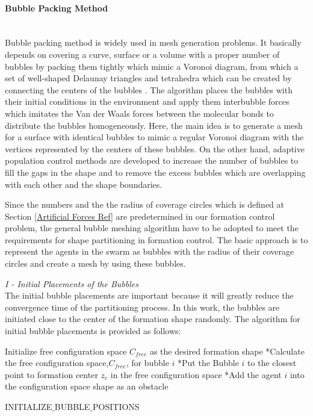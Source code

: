 \paragraph{Bubble Packing Method} \hspace{0pt} \\				
Bubble packing method is widely used in mesh generation problems. It basically depends on covering a curve, surface or a volume with a proper number of bubbles by packing them tightly which mimic a Voronoi diagram, from which a set of well-shaped Delaunay triangles and tetrahedra which can be created by connecting the centers of the bubbles \cite{27}.  The algorithm places the bubbles with their initial conditions in the environment and apply them interbubble forces which imitates the Van der Waals forces between the molecular bonds  to distribute the bubbles homogeneously. Here, the main idea is to generate a mesh for a surface with identical bubbles to mimic a regular Voronoi diagram with the vertices represented by the centers of these bubbles. On the other hand, adaptive population control  methods are developed to increase the number of bubbles to fill the gaps in the shape and to remove the excess bubbles which are overlapping with each other and the shape boundaries. 

Since the numbers and the the radius of coverage circles which is defined at Section \ref{Artificial Forces Ref} are predetermined in our formation control problem, the general bubble meshing algorithm have to be adopted to meet the requirements for shape partitioning in formation control.  The basic approach is to represent the agents in the swarm as bubbles with the radius of  their coverage circles and create a mesh by using these bubbles. \newline
			
\textit{			I - Initial Placements of the Bubbles} \\ 
The initial bubble placements are important because it will greatly reduce the convergence time of the partitioning process. In this work, the bubbles are initiated close to the center of the formation shape randomly. The algorithm for initial bubble placements is provided as follows:
			
\begin{algorithm}[H]
Initialize free configuration space $C_{free}$ as the desired formation shape \newline
{}
{		
*Calculate the free configuration space,$C_{free}$, for bubble $i$\;
*Put the Bubble $i$ to the closest point to  formation center  $z_c$  in the free configuration space\;
*Add the agent $i$ into the configuration space shape as an obstacle \;
}\		
\caption{INITIALIZE$\_$BUBBLE$\_$POSITIONS}
\end{algorithm}
		
